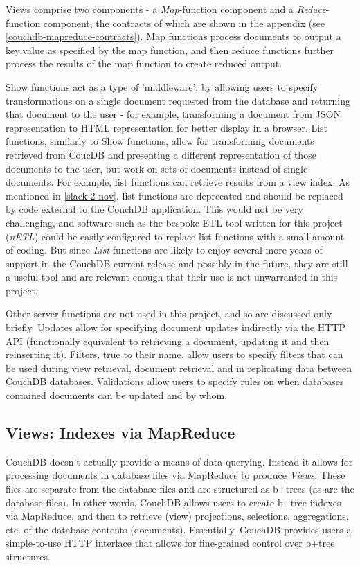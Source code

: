 Views comprise two components - a \textit{Map}-function component and a \textit{Reduce}-function component, the contracts of which are shown in the appendix (see \ref{couchdb-mapreduce-contracts}). Map functions process documents to output a key:value as specified by the map function, and then reduce functions further process the results of the map function to create reduced output.

Show functions act as a type of 'middleware', by allowing users to specify transformations on a single document requested from the database and returning that document to the user - for example, transforming a document from JSON representation to HTML representation for better display in a browser. List functions, similarly to Show functions, allow for transforming documents retrieved from CoucDB and presenting a different representation of those documents to the user, but work on sets of documents instead of single documents. For example, list functions can retrieve results from a view index. As mentioned in \ref{slack-2-nov}, list functions are deprecated and should be replaced by code external to the CouchDB application. This would not be very challenging, and software such as the bespoke ETL tool written for this project (\textit{nETL}) could be easily configured to replace list functions with a small amount of coding. But since \textit{List} functions are likely to enjoy several more years of support in the CouchDB current release and possibly in the future, they are still a useful tool and are relevant enough that their use is not unwarranted in this project.

Other server functions are not used in this project, and so are discussed only briefly. Updates allow for specifying document updates indirectly via the HTTP API (functionally equivalent to retrieving a document, updating it and then reinserting it). Filters, true to their name, allow users to specify filters that can be used during view retrieval, document retrieval and in replicating data between CouchDB databases. Validations allow users to specify rules on when databases contained documents can be updated and by whom.

\subsection{Views: Indexes via MapReduce}
CouchDB doesn't actually provide a means of data-querying. Instead it allows for processing documents in database files via MapReduce to produce \textit{Views}. These files are separate from the database files and are structured as b+trees (as are the database files). In other words, CouchDB allows users to create b+tree indexes via MapReduce, and then to retrieve (view) projections, selections, aggregations, etc. of the database contents (documents). Essentially, CouchDB provides users a simple-to-use HTTP interface that allows for fine-grained control over b+tree structures.


